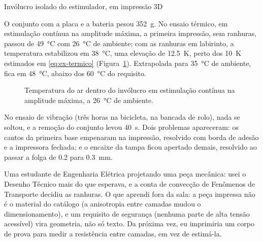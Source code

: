 \begin{atividade}{Invólucro isolado do estimulador, em impressão 3D}
\begin{resultados}
O conjunto com a placa e a bateria pesou \SI{352}{\gram}. No ensaio térmico, em estimulação contínua
na amplitude máxima, a primeira impressão, sem ranhuras, passou de \SI{49}{\celsius} com
\SI{26}{\celsius} de ambiente; com as ranhuras em labirinto, a temperatura estabilizou em
\SI{38}{\celsius}, uma elevação de \SI{12,5}{\kelvin}, perto dos \SI{10}{\kelvin} estimados em
\eqref{eq:ex-termico} (Figura~\ref{fig:ex-termico}). Extrapolada para \SI{35}{\celsius} de ambiente,
fica em \SI{48}{\celsius}, abaixo dos \SI{60}{\celsius} do requisito.

\begin{figure}[htbp]
  \centering
  
  \caption{Temperatura do ar dentro do invólucro em estimulação contínua na amplitude máxima, a
    \SI{26}{\celsius} de ambiente.}
  \label{fig:ex-termico}
\end{figure}

No ensaio de vibração (três horas na bicicleta, na bancada de rolo), nada se soltou, e a
remoção do conjunto levou \SI{40}{\second}. Dois problemas apareceram: os cantos da primeira base
empenaram na impressão, resolvido com borda de adesão e a impressora fechada; e o encaixe da tampa
ficou apertado demais, resolvido ao passar a folga de \num{0,2} para \SI{0,3}{\milli\meter}.
\end{resultados}

\begin{evidencias}
\end{evidencias}

\begin{aprendizados}
Uma estudante de Engenharia Elétrica projetando uma peça mecânica: usei o Desenho Técnico mais do
que esperava, e a conta de convecção de Fenômenos de Transporte decidiu as ranhuras. O que aprendi fora
da sala: a peça impressa não é o material do catálogo (a anisotropia entre camadas mudou o
dimensionamento), e um requisito de segurança (nenhuma parte de alta tensão acessível) vira
geometria, não só texto. Da próxima vez, eu imprimiria um corpo de prova para medir a resistência entre
camadas, em vez de estimá-la.
\end{aprendizados}
\end{atividade}
